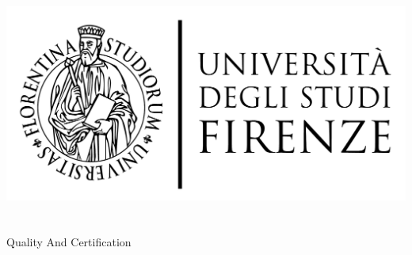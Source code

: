 \begin{titlepage}
	\begin{center}
   	\large
      \hfill
      \vfill
      \begingroup
         \includegraphics[scale=0.15]{logo/LOGO}\\
			\myFaculty \\
			\myDegree \\ 
			\vspace{0.5cm}
         \vspace{0.5cm}    
         Quality And Certification  
      \endgroup 
      \vfill 
      \begingroup
      	\spacedallcaps{\myItalianTitle} \\ $\ $\\
	\bigskip
      \endgroup
      \spacedlowsmallcaps{\myName}
      \vfill
      \vfill
      \vfill
      \myTime
      \vfill                      
	\end{center}        
\end{titlepage}